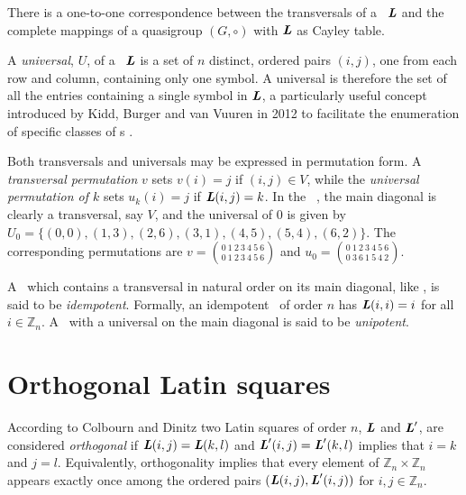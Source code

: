 \begin{theorem}
There is a one-to-one correspondence between the transversals of a \lat \ $\mbox{\bf \emph{L}}$ and the complete mappings of a quasigroup $(G, \circ)$ with $\mbox{\bf \emph{L}}$ as Cayley table.
\end{theorem}

 A \emph{universal}, $U$, of a \lat \ $\mbox{\bf \emph{L}}$ is a set of $n$ distinct, ordered pairs $(i,j)$, one from each row and column, containing only one symbol.  A universal is therefore the set of all the entries containing a single symbol in $\mbox{\bf \emph{L}}$, a particularly useful concept introduced by Kidd, Burger and van Vuuren in 2012 to facilitate the enumeration of specific classes of \lat s \cite{Kidd2012}.

Both transversals and universals may be expressed in permutation form. A \emph{transversal permutation} $v$ sets $v(i) = j$ if $(i,j) \in V$, while the \emph{universal permutation of $k$} sets $u_k(i) = j $ if $\mbox{\bf \emph{L}}(i,j) = k$. In the \lat \  , the main diagonal is clearly a transversal, say $V$, and the universal of $0$ is given by $U_0 = \{(0,0), (1,3), (2,6), (3,1), (4,5), (5,4), (6,2) \}$.  The corresponding permutations are $v= \binom{0 \ 1 \  2\  3\  4\  5\  6}{ 0\ 1\   2\  3\  4\  5\  6 }$  and  $u_0 =\binom{0\ 1\   2\  3\  4\  5\  6}{0\ 3\ 6\ 1\ 5\ 4\ 2 }$.


A \lat \ which contains a transversal in natural order on its main diagonal, like  , is said to be \emph{idempotent}. Formally, an idempotent \lat \  of order $n$ has $\mbox{\bf \emph{L}}(i,i) = i$ for all $i\in \mathbb{Z}_n$. A \lat \ with a universal on the main diagonal is said to be \emph{unipotent}. 
\section{Orthogonal Latin squares}
According to Colbourn and Dinitz \cite[Definition 3.1]{colb} two Latin squares of order $n$, $\mbox{\bf \emph{L}}$ and $\mbox{\bf \emph{L}}'$, are considered \emph{orthogonal} if $\mbox{\bf \emph{L}}(i,j) = \mbox{\bf \emph{L}}(k,l)$ and $\mbox{\bf \emph{L}}'(i,j) = \mbox{\bf \emph{L}}'(k,l)$ implies that $i=k$ and $j=l$. Equivalently, orthogonality implies that every element of $\mathbb{Z}_n \times \mathbb{Z}_n$ appears exactly once among the ordered pairs $(\mbox{\bf \emph{L}}(i,j), \mbox{\bf \emph{L}}'(i,j))$ for $i,j \in \mathbb{Z}_n$.

